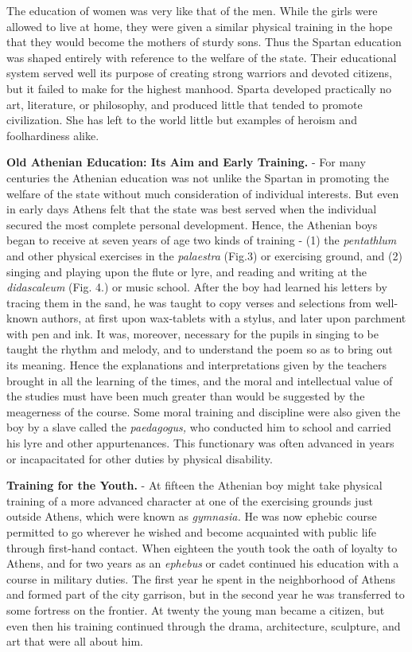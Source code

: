 \documentclass[
]{book}
\begin{document}
The education of women was very like that of the men. While the girls were allowed to live at home, they were given a similar physical training in the hope that they would become the mothers of sturdy sons. Thus the Spartan education was shaped entirely with reference to the welfare of the state. Their educational system served well its purpose of creating strong warriors and devoted citizens, but it failed to make for the highest manhood. Sparta developed practically no art, literature, or philosophy, and produced little that tended to promote civilization. She has left to the world little but examples of heroism and foolhardiness alike.

\textbf{Old Athenian Education: Its Aim and Early Training.} - For many centuries the Athenian education was not unlike the Spartan in promoting the welfare of the state without much consideration of individual interests. But even in early days Athens felt that the state was best served when the individual secured the most complete personal development. Hence, the Athenian boys began to receive at seven years of age two kinds of training - (1) the \emph{pentathlum} and other physical exercises in the \emph{palaestra} (Fig.3) or exercising ground, and (2) singing and playing upon the flute or lyre, and reading and writing at the \emph{didascaleum} (Fig. 4.) or music school. After the boy had learned his letters by tracing them in the sand, he was taught to copy verses and selections from well-known authors, at first upon wax-tablets with a stylus, and later upon parchment with pen and ink. It was, moreover, necessary for the pupils in singing to be taught the rhythm and melody, and to understand the poem so as to bring out its meaning. Hence the explanations and interpretations given by the teachers brought in all the learning of the times, and the moral and intellectual value of the studies must have been much greater than would be suggested by the meagerness of the course. Some moral training and discipline were also given the boy by a slave called the \emph{paedagogus,} who conducted him to school and carried his lyre and other appurtenances. This functionary was often advanced in years or incapacitated for other duties by physical disability.

\textbf{Training for the Youth.} - At fifteen the Athenian boy might take physical training of a more advanced character at one of the exercising grounds just outside Athens, which were known as \emph{gymnasia.} He was now ephebic course permitted to go wherever he wished and become acquainted with public life through first-hand contact. When eighteen the youth took the oath of loyalty to Athens, and for two years as an \emph{ephebus} or cadet continued his education with a course in military duties. The first year he spent in the neighborhood of Athens and formed part of the city garrison, but in the second year he was transferred to some fortress on the frontier. At twenty the young man became a citizen, but even then his training continued through the drama, architecture, sculpture, and art that were all about him.
\end{document}

